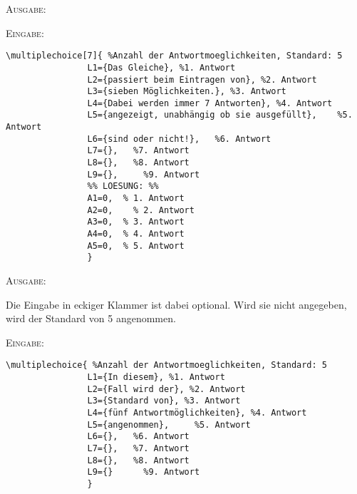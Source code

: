 \documentclass[a4paper,12pt]{article}
\begin{document}
\textsc{Ausgabe:}\leer



\textsc{Eingabe:}

\begin{verbatim}
\multiplechoice[7]{ %Anzahl der Antwortmoeglichkeiten, Standard: 5
				L1={Das Gleiche}, %1. Antwort 
				L2={passiert beim Eintragen von}, %2. Antwort
				L3={sieben Möglichkeiten.}, %3. Antwort
				L4={Dabei werden immer 7 Antworten}, %4. Antwort
				L5={angezeigt, unabhängig ob sie ausgefüllt},	 %5. Antwort
				L6={sind oder nicht!},	 %6. Antwort
				L7={},	 %7. Antwort
				L8={},	 %8. Antwort
				L9={},	   %9. Antwort
				%% LOESUNG: %%
				A1=0,  % 1. Antwort
				A2=0,	 % 2. Antwort
				A3=0,  % 3. Antwort
				A4=0,  % 4. Antwort
				A5=0,  % 5. Antwort
				}
\end{verbatim}

\leer

\textsc{Ausgabe:}

				

\newpage

Die Eingabe in eckiger Klammer ist dabei optional. Wird sie nicht angegeben, wird der Standard von 5 angenommen. 

\leer




\textsc{Eingabe:}
\begin{verbatim}
\multiplechoice{ %Anzahl der Antwortmoeglichkeiten, Standard: 5
				L1={In diesem}, %1. Antwort 
				L2={Fall wird der}, %2. Antwort
				L3={Standard von}, %3. Antwort
				L4={fünf Antwortmöglichkeiten}, %4. Antwort
				L5={angenommen},	 %5. Antwort
				L6={},	 %6. Antwort
				L7={},	 %7. Antwort
				L8={},	 %8. Antwort
				L9={}	   %9. Antwort
				}
\end{verbatim}
\end{document}
